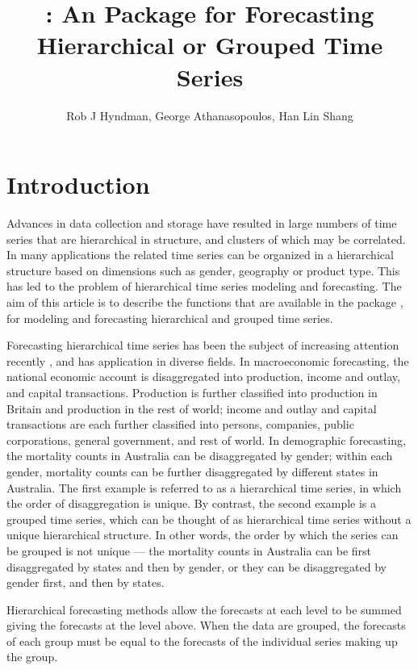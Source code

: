\documentclass[nojss]{jss}
\author{Rob J Hyndman, George Athanasopoulos, Han Lin Shang}
\title{\pkg{hts}: An {\R} Package for Forecasting Hierarchical or Grouped Time Series}
\newcommand{\R}{\proglang{R}}
\begin{document}
    
\section*{Introduction}


Advances in data collection and storage have resulted in large numbers of time series that are hierarchical in structure, and clusters of which may be correlated. In many applications the related time series can be organized in a hierarchical structure based on dimensions such as gender, geography or product type. This has led to the problem of hierarchical time series modeling and forecasting. The aim of this article is to describe the {\R} functions that are available in the  package \citep{HAH13}, for modeling and forecasting hierarchical and grouped time series.

Forecasting hierarchical time series has been the subject of increasing attention recently \citep[e.g.,][]{GAH09}, and has application in diverse fields. In macroeconomic forecasting, the national economic account is disaggregated into production, income and outlay, and capital transactions. Production is further classified into production in Britain and production in the rest of world; income and outlay and capital transactions are each further classified into persons, companies, public corporations, general government, and rest of world. In demographic forecasting, the mortality counts in Australia can be disaggregated by gender; within each gender, mortality counts can be further disaggregated by different states in Australia. The first example is referred to as a hierarchical time series, in which the order of disaggregation is unique. By contrast, the second example is a grouped time series, which can be thought of as hierarchical time series without a unique hierarchical structure. In other words, the order by which the series can be grouped is not unique --- the mortality counts in Australia can be first disaggregated by states and then by gender, or they can be disaggregated by gender first, and then by states.

Hierarchical forecasting methods allow the forecasts at each level to be summed giving the forecasts at the level above. When the data are grouped, the forecasts of each group must be equal to the forecasts of the individual series making up the group.
\end{document}
